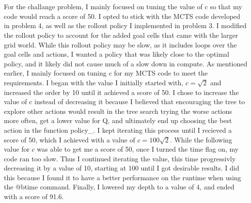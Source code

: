 \documentclass[11pt]{article}
\begin{document}
\section{}

For the challange problem, I mainly focused on tuning the value of c so that my code would reach a score of 50. I opted to stick with the MCTS code developed in 
problem 4, as well as the rollout policy I implemented in problem 3. I modified the rollout policy to account for the added goal cells that came with the larger grid world. While this rollout policy
may be slow, as it includes loops over the goal cells and actions, I wanted a policy that was likely close to the optimal policy, and it likely did not cause much of a slow down in compute. As mentioned earlier, I mainly
focused on tuning c for my MCTS code to meet the requirements. I began with the value I initially started with, $c = \sqrt{2}$ and increased the order by 10 until it achieved a score of 50. I chose to increase the value of c instead of decreasing it because I believed that encouraging the tree to explore other actions 
would result in the tree search trying the worse actions more often, get a lower value for Q, and ultimately end up choosing the best action in the function policy\_. I kept iterating this
process until I recieved a score of 50, which I achieved with a value of $c = 100\sqrt{2}$. While the following value for $c$ was able to get me a score of 50, once I turned the time flag on, my code ran too slow. Thus I continued iterating the value, 
this time progressivly decreasing it by a value of 10, starting at 100 until I got desirable results. I did this because I found it to have a better performance on the runtime when using the @btime command. Finally, I lowered my depth to a value of 4, and ended with a score of 91.6.
\end{document}
